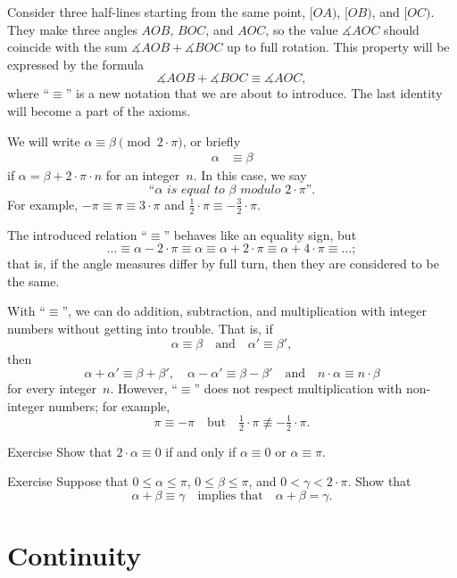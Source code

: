 Consider three half-lines starting from the same point, $[O A)$, $[O B)$, and $[O C)$.
They make three angles $A O B$, $B O C$, and $A O C$,
so the value $\measuredangle A O C$ should coincide with
the sum $\measuredangle A O B+\measuredangle B O C$ up to full rotation.
This property will be expressed by the formula 
$$\measuredangle A O B+\measuredangle B O C\equiv \measuredangle A O C,$$
where ``$\equiv$'' is a new notation that we are about to introduce.
The last identity will become a part of the axioms.

We will write $\alpha\equiv\beta\pmod{2\cdot\pi}$, or briefly
\begin{align*}
\alpha&\equiv\beta
\end{align*}
if $\alpha=\beta+2\cdot\pi\cdot n$
for an integer~$n$.
In this case, we say 
$$\textit{``$\alpha$ is equal to $\beta$ modulo $2\cdot\pi$''}.$$
For example, $-\pi
\equiv
\pi\equiv 3\cdot\pi$ and $\tfrac12\cdot\pi
\equiv
-\tfrac32\cdot\pi$.

The introduced relation ``$\equiv$'' behaves like an equality sign,
but
\[\dots\equiv\alpha-2\cdot\pi\equiv \alpha\equiv \alpha+2\cdot\pi\equiv \alpha+4\cdot\pi\equiv\dots;\] 
that is, if the angle measures differ by full turn,
then they are considered to be the same.

With ``$\equiv$'', we can do addition, subtraction, and multiplication with integer numbers without getting into trouble.
That is, if
$$\alpha\equiv\beta
\quad
\text{and}
\quad
\alpha'\equiv \beta',$$ 
then
$$\alpha+\alpha'\equiv\beta+\beta',
\quad
\alpha-\alpha'\equiv \beta-\beta'
\quad 
\text{and}
\quad
n\cdot\alpha\equiv n\cdot\beta$$
for every integer~$n$.
However, ``$\equiv$'' does not respect multiplication with non-integer numbers; for example, 
$$\pi
\equiv 
-\pi
\quad
\text{but}
\quad
\tfrac12\cdot\pi
\not\equiv
-\tfrac12\cdot\pi.$$ 

\begin{thm}[!]{Exercise}\label{ex:2a=0}
Show that $2\cdot\alpha\equiv0$ if and only if $\alpha\equiv0$ or $\alpha\equiv\pi$.
\end{thm}

\begin{thm}[!]{Exercise}\label{ex:a+b==c}
Suppose that $0\le \alpha\le \pi$, $0\le \beta\le \pi$, and $0<\gamma<2\cdot \pi$.
Show that
\[\alpha+\beta\equiv \gamma\quad\text{implies that}\quad\alpha+\beta=\gamma.\]
\end{thm}


\section{Continuity}

